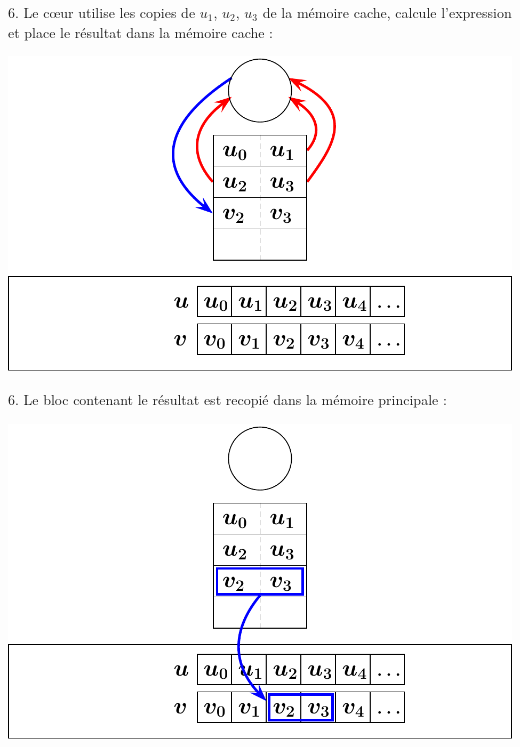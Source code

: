 \documentclass{beamer}
\begin{document}
\begin{frame}
	\parbox[t][1cm]{10cm}{6. Le c\oe ur utilise les copies de $u_1$, $u_2$, $u_3$ de la mémoire cache, calcule l'expression et place le résultat dans la mémoire cache :}
	\begin{center}
		\includegraphics[scale=0.6]{../../Images/sequentiel6}
	\end{center}
\end{frame}
\begin{frame}
	\parbox[t][1cm]{10cm}{6. Le bloc contenant le résultat est recopié dans la mémoire principale :}
	\begin{center}
		\includegraphics[scale=0.6]{../../Images/sequentiel7}
	\end{center}
\end{frame}
\end{document}
